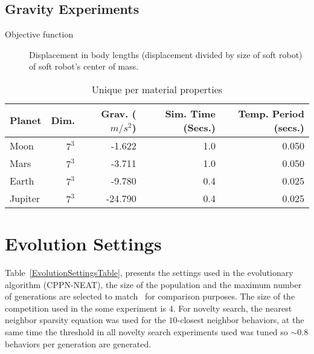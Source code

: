 \section{Gravity Experiments}
\label{gravitySettings}
\begin{small}
\begin{description}
\item[Objective function]{Displacement in body lengths (displacement divided by size of soft robot) of soft robot's center of mass.}
\end{description}
\end{small}
\begin{table}[ht!]
\centering
\caption{Unique per material properties}
\label{UniqueGravitySettings}
    \begin{tabular}{lrrrr}
    \toprule
    \textbf{Planet} & \textbf{Dim.} & \textbf{Grav.} ($m/s^2$) & \textbf{Sim. Time} (Secs.) & \textbf{Temp. Period} (secs.) \\
    \midrule
    Moon & $7^3$ & -1.622 & 1.0 & 0.050 \\
    Mars & $7^3$ & -3.711 & 1.0 & 0.050 \\
    Earth & $7^3$ & -9.780 & 0.4 & 0.025 \\
    Jupiter & $7^3$ & -24.790 & 0.4 & 0.025\\
    \bottomrule
    \end{tabular}
\end{table}















\chapter{Evolution Settings} %
\label{EvolutionSettings} %


Table~\ref{EvolutionSettingsTable}, presents the settings used in the evolutionary algorithm (CPPN-NEAT), the size of the population and the maximum number of generations are selected to match~\cite{cheney2013unshackling} for comparison purposes. The size of the competition used in the some experiment is $4$. For novelty search, the nearest neighbor sparsity equation was used for the $10$-closest neighbor behaviors, at the same time the threshold in all novelty search experiments used was tuned so $\sim 0.8$ behaviors per generation are generated.

